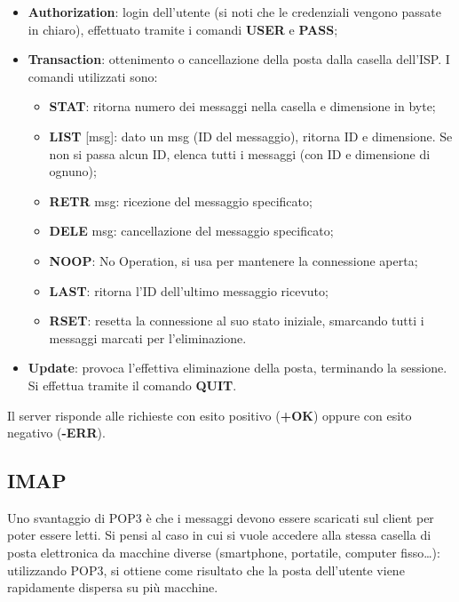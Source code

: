         \begin{itemize}
            \item \textbf{Authorization}: login dell’utente (si noti che le credenziali vengono passate in chiaro),
            effettuato tramite i comandi \textbf{USER} e \textbf{PASS};
            \item \textbf{Transaction}: ottenimento o cancellazione della posta dalla casella dell’ISP. I comandi
            utilizzati sono:
            \begin{itemize}
                \item \textbf{STAT}: ritorna numero dei messaggi nella casella e dimensione in byte;
                \item \textbf{LIST} [msg]: dato un msg (ID del messaggio), ritorna ID e dimensione. Se non si
                passa alcun ID, elenca tutti i messaggi (con ID e dimensione di ognuno);
                \item \textbf{RETR} msg: ricezione del messaggio specificato;
                \item \textbf{DELE} msg: cancellazione del messaggio specificato;
                \item \textbf{NOOP}: No Operation, si usa per mantenere la connessione aperta;
                \item \textbf{LAST}: ritorna l’ID dell’ultimo messaggio ricevuto;
                \item \textbf{RSET}: resetta la connessione al suo stato iniziale, smarcando tutti i messaggi
                marcati per l’eliminazione.
            \end{itemize}
            \item \textbf{Update}: provoca l’effettiva eliminazione della posta, terminando la sessione. Si effettua
            tramite il comando \textbf{QUIT}.
        \end{itemize}
        
        Il server risponde alle richieste con esito positivo (\textbf{+OK}) oppure con esito negativo (\textbf{-ERR}).

    \subsection{IMAP}
        Uno svantaggio di POP3 è che i messaggi devono essere scaricati sul client per poter essere letti.
        Si pensi al caso in cui si vuole accedere alla stessa casella di posta elettronica da macchine
        diverse (smartphone, portatile, computer fisso…): utilizzando POP3, si ottiene come risultato
        che la posta dell’utente viene rapidamente dispersa su più macchine.\\

